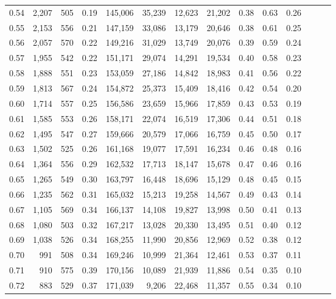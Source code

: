 \begin{tabular}{rrrrrrrrrrrrrr}
0.54 &  2,207 &  505 &  0.19 &  145,006 &   35,239 &  12,623 &  21,202 &  0.38 &  0.63 &      0.26 \\
0.55 &  2,153 &  556 &  0.21 &  147,159 &   33,086 &  13,179 &  20,646 &  0.38 &  0.61 &      0.25 \\
0.56 &  2,057 &  570 &  0.22 &  149,216 &   31,029 &  13,749 &  20,076 &  0.39 &  0.59 &      0.24 \\
0.57 &  1,955 &  542 &  0.22 &  151,171 &   29,074 &  14,291 &  19,534 &  0.40 &  0.58 &      0.23 \\
0.58 &  1,888 &  551 &  0.23 &  153,059 &   27,186 &  14,842 &  18,983 &  0.41 &  0.56 &      0.22 \\
0.59 &  1,813 &  567 &  0.24 &  154,872 &   25,373 &  15,409 &  18,416 &  0.42 &  0.54 &      0.20 \\
0.60 &  1,714 &  557 &  0.25 &  156,586 &   23,659 &  15,966 &  17,859 &  0.43 &  0.53 &      0.19 \\
0.61 &  1,585 &  553 &  0.26 &  158,171 &   22,074 &  16,519 &  17,306 &  0.44 &  0.51 &      0.18 \\
0.62 &  1,495 &  547 &  0.27 &  159,666 &   20,579 &  17,066 &  16,759 &  0.45 &  0.50 &      0.17 \\
0.63 &  1,502 &  525 &  0.26 &  161,168 &   19,077 &  17,591 &  16,234 &  0.46 &  0.48 &      0.16 \\
0.64 &  1,364 &  556 &  0.29 &  162,532 &   17,713 &  18,147 &  15,678 &  0.47 &  0.46 &      0.16 \\
0.65 &  1,265 &  549 &  0.30 &  163,797 &   16,448 &  18,696 &  15,129 &  0.48 &  0.45 &      0.15 \\
0.66 &  1,235 &  562 &  0.31 &  165,032 &   15,213 &  19,258 &  14,567 &  0.49 &  0.43 &      0.14 \\
0.67 &  1,105 &  569 &  0.34 &  166,137 &   14,108 &  19,827 &  13,998 &  0.50 &  0.41 &      0.13 \\
0.68 &  1,080 &  503 &  0.32 &  167,217 &   13,028 &  20,330 &  13,495 &  0.51 &  0.40 &      0.12 \\
0.69 &  1,038 &  526 &  0.34 &  168,255 &   11,990 &  20,856 &  12,969 &  0.52 &  0.38 &      0.12 \\
0.70 &    991 &  508 &  0.34 &  169,246 &   10,999 &  21,364 &  12,461 &  0.53 &  0.37 &      0.11 \\
0.71 &    910 &  575 &  0.39 &  170,156 &   10,089 &  21,939 &  11,886 &  0.54 &  0.35 &      0.10 \\
0.72 &    883 &  529 &  0.37 &  171,039 &    9,206 &  22,468 &  11,357 &  0.55 &  0.34 &      0.10 \\

\end{tabular}
